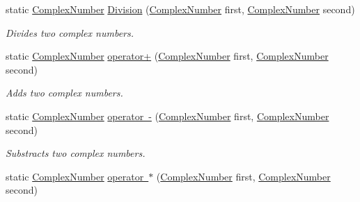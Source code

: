 \begin{DoxyCompactItemize}
static \mbox{\hyperlink{class_test_project_1_1_task_library_1_1_tasks_1_1_lesson1_1_1_models_1_1_complex_number}{Complex\+Number}} \mbox{\hyperlink{class_test_project_1_1_task_library_1_1_tasks_1_1_lesson1_1_1_models_1_1_complex_number_a577008020627f4644b0f3a480e4342ff}{Division}} (\mbox{\hyperlink{class_test_project_1_1_task_library_1_1_tasks_1_1_lesson1_1_1_models_1_1_complex_number}{Complex\+Number}} first, \mbox{\hyperlink{class_test_project_1_1_task_library_1_1_tasks_1_1_lesson1_1_1_models_1_1_complex_number}{Complex\+Number}} second)
\begin{DoxyCompactList}\small\item\em Divides two complex numbers. \end{DoxyCompactList}\item 
static \mbox{\hyperlink{class_test_project_1_1_task_library_1_1_tasks_1_1_lesson1_1_1_models_1_1_complex_number}{Complex\+Number}} \mbox{\hyperlink{class_test_project_1_1_task_library_1_1_tasks_1_1_lesson1_1_1_models_1_1_complex_number_ab6be3b2b94d7a6646f238ff9fd7a25d6}{operator+}} (\mbox{\hyperlink{class_test_project_1_1_task_library_1_1_tasks_1_1_lesson1_1_1_models_1_1_complex_number}{Complex\+Number}} first, \mbox{\hyperlink{class_test_project_1_1_task_library_1_1_tasks_1_1_lesson1_1_1_models_1_1_complex_number}{Complex\+Number}} second)
\begin{DoxyCompactList}\small\item\em Adds two complex numbers. \end{DoxyCompactList}\item 
static \mbox{\hyperlink{class_test_project_1_1_task_library_1_1_tasks_1_1_lesson1_1_1_models_1_1_complex_number}{Complex\+Number}} \mbox{\hyperlink{class_test_project_1_1_task_library_1_1_tasks_1_1_lesson1_1_1_models_1_1_complex_number_a02f8df187dbf1e0da228d8570ae0e42a}{operator -\/}} (\mbox{\hyperlink{class_test_project_1_1_task_library_1_1_tasks_1_1_lesson1_1_1_models_1_1_complex_number}{Complex\+Number}} first, \mbox{\hyperlink{class_test_project_1_1_task_library_1_1_tasks_1_1_lesson1_1_1_models_1_1_complex_number}{Complex\+Number}} second)
\begin{DoxyCompactList}\small\item\em Substracts two complex numbers. \end{DoxyCompactList}\item 
static \mbox{\hyperlink{class_test_project_1_1_task_library_1_1_tasks_1_1_lesson1_1_1_models_1_1_complex_number}{Complex\+Number}} \mbox{\hyperlink{class_test_project_1_1_task_library_1_1_tasks_1_1_lesson1_1_1_models_1_1_complex_number_a947f366279dbac5845394fe7b800c02b}{operator $\ast$}} (\mbox{\hyperlink{class_test_project_1_1_task_library_1_1_tasks_1_1_lesson1_1_1_models_1_1_complex_number}{Complex\+Number}} first, \mbox{\hyperlink{class_test_project_1_1_task_library_1_1_tasks_1_1_lesson1_1_1_models_1_1_complex_number}{Complex\+Number}} second)

\end{DoxyCompactItemize}
